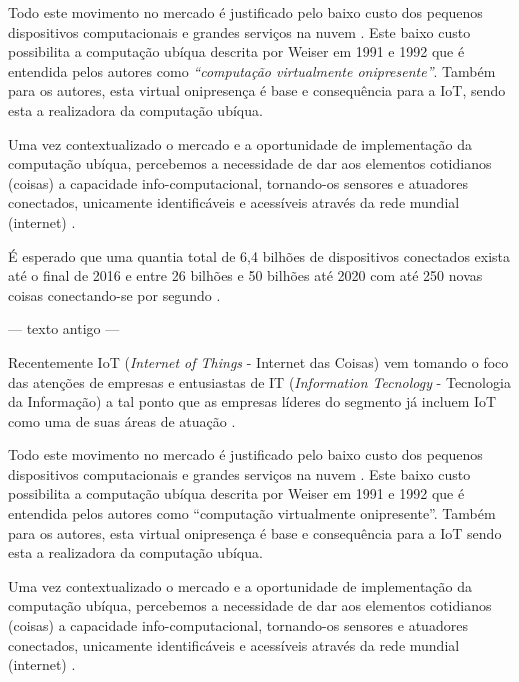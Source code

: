 \documentclass[
	12pt,				%
	openright,			%
	oneside,			%
	a4paper,			%
	chapter=TITLE,		%
	english,			%
	french,				%
	spanish,			%
	brazil				%
	]{abntex2}
\begin{document}
{Todo este movimento no mercado é justificado pelo baixo custo dos pequenos
dispositivos computacionais \cite{RpiZeroLaunch} \cite{Esp8266.net} e grandes serviços na
nuvem \cite{Kaufmann2015} \cite{Amazon2016}. Este baixo custo possibilita a computação
ubíqua descrita por Weiser em 1991 e 1992 \cite{Weiser1999} que é entendida pelos
autores como \textit{``computação virtualmente onipresente''}. Também para os autores,
esta virtual onipresença é base e consequência para a IoT, sendo esta a
realizadora da computação ubíqua.

Uma vez contextualizado o mercado e a oportunidade de implementação da
computação ubíqua, percebemos a necessidade de dar aos elementos cotidianos
(coisas) a capacidade info-computacional, tornando-os sensores e atuadores
conectados, unicamente identificáveis e acessíveis através da rede mundial
(internet) \cite{Lemos2013} \cite{Kranenburg2012}.

É esperado que uma quantia total de 6,4 bilhões de dispositivos conectados
exista até o final de 2016 \cite{GARTNER2015} e entre 26 bilhões \cite{GARTNER2014} e 50
bilhões até 2020 com até 250 novas coisas conectando-se por segundo
\cite{CiscoBlog2013}.


--- texto antigo ---

Recentemente IoT (\textit{Internet of Things} - Internet das Coisas) vem tomando
o foco das atenções de empresas e entusiastas de IT (\textit{Information
Tecnology} - Tecnologia da Informação) \cite{DzoneIoT:2015} a tal ponto que as
empresas líderes do segmento já incluem IoT como uma de suas áreas de atuação
\cite{Ibm2016} \cite{ARM-mbed} \cite{Microsoft2016} \cite{Intel2016}
\cite{Oracle2016} \cite{Google2016} \cite{AmazonIoT2016}.

Todo este movimento no mercado é justificado pelo baixo custo dos pequenos
dispositivos computacionais \cite{RpiZeroLaunch} \cite{Esp8266.net} e grandes
serviços na nuvem \cite{Kaufmann2015} \cite{Amazon2016}. Este baixo custo
possibilita a computação ubíqua descrita por Weiser em 1991 e 1992
\cite{Weiser1999} que é entendida pelos autores como ``computação virtualmente
onipresente''. Também para os autores, esta virtual onipresença é base e
consequência para a IoT sendo esta a realizadora da computação ubíqua.

Uma vez contextualizado o mercado e a oportunidade de implementação da
computação ubíqua, percebemos a necessidade de dar aos elementos cotidianos
(coisas) a capacidade info-computacional, tornando-os sensores e atuadores
conectados, unicamente identificáveis e acessíveis através da rede mundial
(internet) \cite{Lemos2013} \cite{Kranenburg2012}.

}
\end{document}
